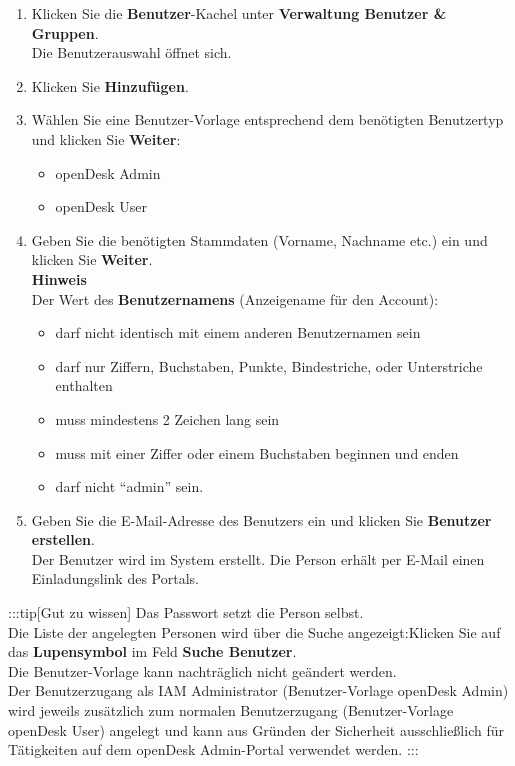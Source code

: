 \documentclass[
  letterpaper,
  DIV=11,
  numbers=noendperiod]{scrreprt}
\providecommand{\tightlist}{%
  \setlength{\itemsep}{0pt}\setlength{\parskip}{0pt}}\usepackage{longtable,booktabs,array}
\begin{document}
\begin{enumerate}
\def\labelenumi{\arabic{enumi}.}
\tightlist
\item
  Klicken Sie die \textbf{Benutzer}-Kachel unter \textbf{Verwaltung
  Benutzer \& Gruppen}.\\
  Die Benutzerauswahl öffnet sich.\\
\item
  Klicken Sie \textbf{Hinzufügen}.\\
\item
  Wählen Sie eine Benutzer-Vorlage entsprechend dem benötigten
  Benutzertyp und klicken Sie \textbf{Weiter}:

  \begin{itemize}
  \tightlist
  \item
    openDesk Admin\\
  \item
    openDesk User\\
  \end{itemize}
\item
  Geben Sie die benötigten Stammdaten (Vorname, Nachname etc.) ein und
  klicken Sie \textbf{Weiter}.\\
  \textbf{Hinweis}\\
  Der Wert des \textbf{Benutzernamens} (Anzeigename für den Account):

  \begin{itemize}
  \tightlist
  \item
    darf nicht identisch mit einem anderen Benutzernamen sein
  \item
    darf nur Ziffern, Buchstaben, Punkte, Bindestriche, oder
    Unterstriche enthalten
  \item
    muss mindestens 2 Zeichen lang sein
  \item
    muss mit einer Ziffer oder einem Buchstaben beginnen und enden
  \item
    darf nicht ``admin'' sein.
  \end{itemize}
\item
  Geben Sie die E-Mail-Adresse des Benutzers ein und klicken Sie
  \textbf{Benutzer erstellen}.\\
  Der Benutzer wird im System erstellt. Die Person erhält per E-Mail
  einen Einladungslink des Portals.
\end{enumerate}

:::tip{[}Gut zu wissen{]} Das Passwort setzt die Person selbst.\\
Die Liste der angelegten Personen wird über die Suche angezeigt:Klicken
Sie auf das \textbf{Lupensymbol} im Feld \textbf{Suche Benutzer}.\\
Die Benutzer-Vorlage kann nachträglich nicht geändert werden.\\
Der Benutzerzugang als IAM Administrator (Benutzer-Vorlage openDesk
Admin) wird jeweils zusätzlich zum normalen Benutzerzugang
(Benutzer-Vorlage openDesk User) angelegt und kann aus Gründen der
Sicherheit ausschließlich für Tätigkeiten auf dem openDesk Admin-Portal
verwendet werden. :::
\end{document}

